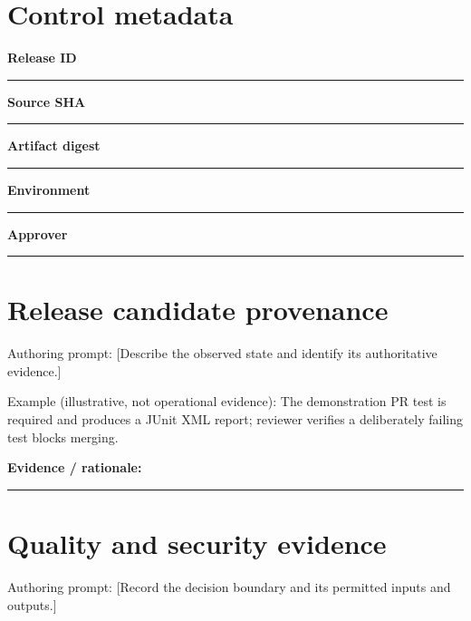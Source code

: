 \documentclass[11pt,letterpaper]{article}
\begin{document}
\makedoctitle\makedocsummary
\section{Control metadata}
\noindent\textbf{Release ID}\par\nobreak\vspace{6pt}\noindent\rule{0.93\linewidth}{0.4pt}\par\vspace{14pt}
\noindent\textbf{Source SHA}\par\nobreak\vspace{6pt}\noindent\rule{0.93\linewidth}{0.4pt}\par\vspace{14pt}
\noindent\textbf{Artifact digest}\par\nobreak\vspace{6pt}\noindent\rule{0.93\linewidth}{0.4pt}\par\vspace{14pt}
\noindent\textbf{Environment}\par\nobreak\vspace{6pt}\noindent\rule{0.93\linewidth}{0.4pt}\par\vspace{14pt}
\noindent\textbf{Approver}\par\nobreak\vspace{6pt}\noindent\rule{0.93\linewidth}{0.4pt}\par\vspace{14pt}
\section{Release candidate provenance}
Authoring prompt: [Describe the observed state and identify its authoritative evidence.]

Example (illustrative, not operational evidence): The demonstration PR test is required and produces a JUnit XML report; reviewer verifies a deliberately failing test blocks merging.

\noindent\textbf{Evidence / rationale:}\par\nobreak\vspace{8pt}\noindent\rule{0.93\linewidth}{0.4pt}\par\vspace{14pt}
\section{Quality and security evidence}
Authoring prompt: [Record the decision boundary and its permitted inputs and outputs.]
\end{document}
